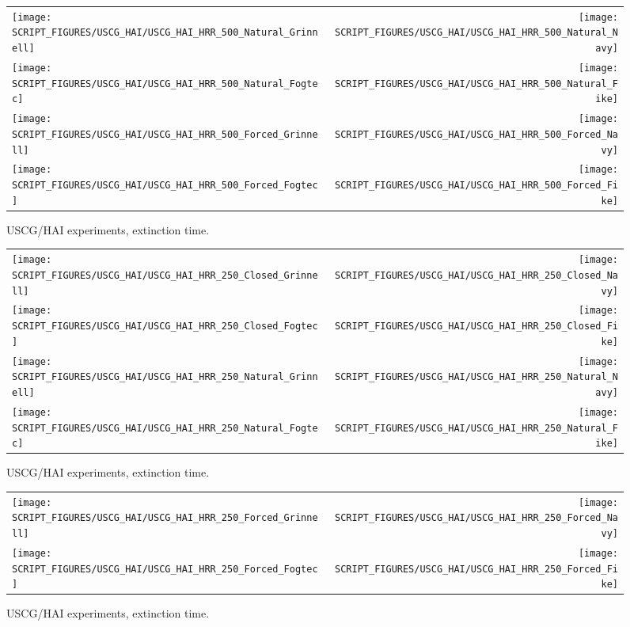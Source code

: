 \begin{figure}[p]
\begin{tabular*}{\textwidth}{l@{\extracolsep{\fill}}r}
\texttt{[image: SCRIPT\_FIGURES/USCG\_HAI/USCG\_HAI\_HRR\_500\_Natural\_Grinnell]} &
\texttt{[image: SCRIPT\_FIGURES/USCG\_HAI/USCG\_HAI\_HRR\_500\_Natural\_Navy]} \\
\texttt{[image: SCRIPT\_FIGURES/USCG\_HAI/USCG\_HAI\_HRR\_500\_Natural\_Fogtec]} &
\texttt{[image: SCRIPT\_FIGURES/USCG\_HAI/USCG\_HAI\_HRR\_500\_Natural\_Fike]} \\
\texttt{[image: SCRIPT\_FIGURES/USCG\_HAI/USCG\_HAI\_HRR\_500\_Forced\_Grinnell]} &
\texttt{[image: SCRIPT\_FIGURES/USCG\_HAI/USCG\_HAI\_HRR\_500\_Forced\_Navy]} \\
\texttt{[image: SCRIPT\_FIGURES/USCG\_HAI/USCG\_HAI\_HRR\_500\_Forced\_Fogtec]} &
\texttt{[image: SCRIPT\_FIGURES/USCG\_HAI/USCG\_HAI\_HRR\_500\_Forced\_Fike]}
\end{tabular*}
\caption[USCG/HAI experiments, extinction time]{USCG/HAI experiments, extinction time.}
\label{USCG_HAI_6}
\end{figure}

\begin{figure}[p]
\begin{tabular*}{\textwidth}{l@{\extracolsep{\fill}}r}
\texttt{[image: SCRIPT\_FIGURES/USCG\_HAI/USCG\_HAI\_HRR\_250\_Closed\_Grinnell]} &
\texttt{[image: SCRIPT\_FIGURES/USCG\_HAI/USCG\_HAI\_HRR\_250\_Closed\_Navy]} \\
\texttt{[image: SCRIPT\_FIGURES/USCG\_HAI/USCG\_HAI\_HRR\_250\_Closed\_Fogtec]} &
\texttt{[image: SCRIPT\_FIGURES/USCG\_HAI/USCG\_HAI\_HRR\_250\_Closed\_Fike]} \\
\texttt{[image: SCRIPT\_FIGURES/USCG\_HAI/USCG\_HAI\_HRR\_250\_Natural\_Grinnell]} &
\texttt{[image: SCRIPT\_FIGURES/USCG\_HAI/USCG\_HAI\_HRR\_250\_Natural\_Navy]} \\
\texttt{[image: SCRIPT\_FIGURES/USCG\_HAI/USCG\_HAI\_HRR\_250\_Natural\_Fogtec]} &
\texttt{[image: SCRIPT\_FIGURES/USCG\_HAI/USCG\_HAI\_HRR\_250\_Natural\_Fike]}
\end{tabular*}
\caption[USCG/HAI experiments, extinction time]{USCG/HAI experiments, extinction time.}
\label{USCG_HAI_8}
\end{figure}


\begin{figure}[p]
\begin{tabular*}{\textwidth}{l@{\extracolsep{\fill}}r}
\texttt{[image: SCRIPT\_FIGURES/USCG\_HAI/USCG\_HAI\_HRR\_250\_Forced\_Grinnell]} &
\texttt{[image: SCRIPT\_FIGURES/USCG\_HAI/USCG\_HAI\_HRR\_250\_Forced\_Navy]} \\
\texttt{[image: SCRIPT\_FIGURES/USCG\_HAI/USCG\_HAI\_HRR\_250\_Forced\_Fogtec]} &
\texttt{[image: SCRIPT\_FIGURES/USCG\_HAI/USCG\_HAI\_HRR\_250\_Forced\_Fike]}
\end{tabular*}
\caption[USCG/HAI experiments, extinction time]{USCG/HAI experiments, extinction time.}
\label{USCG_HAI_9}
\end{figure}

